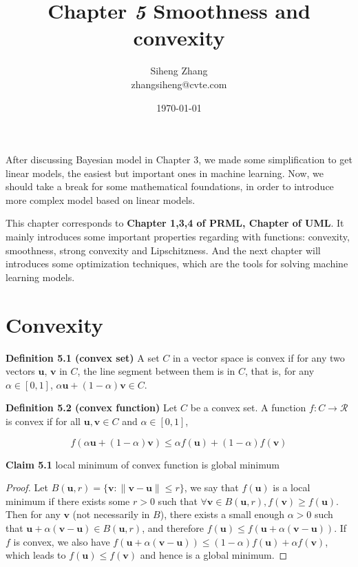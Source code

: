 \documentclass{article}
\author{Siheng Zhang\\zhangsiheng@cvte.com}
\title{Chapter \textbf{\textit{5}} Smoothness and convexity}
\date{\today}
\newtheorem*{proof}{Proof}
\begin{document}
\maketitle  

After discussing Bayesian model in Chapter 3, we made some simplification to get linear models, the easiest but important ones in machine learning. Now, we should take a break for some mathematical foundations, in order to introduce more complex model based on linear models.

This chapter corresponds to \textbf{Chapter 1,3,4 of PRML, Chapter of UML}. It mainly introduces some important properties regarding with functions: convexity, smoothness, strong convexity and Lipschitzness. And the next chapter will introduces some optimization techniques, which are the tools for solving machine learning models.

\tableofcontents
\newpage

\section{Convexity}

	\textbf{Definition 5.1 (convex set)} A set $C$ in a vector space is convex if for any two vectors $\mathbf{u}$, $\mathbf{v}$ in $C$, the line segment between them is in $C$, that is, for any $\alpha\in[0,1]$, $\alpha \mathbf{u} + (1-\alpha) \mathbf{v} \in C$.
	
	\textbf{Definition 5.2 (convex function)} Let $C$ be a convex set. A function $f: C\rightarrow \mathcal{R}$ is convex if for all $\mathbf{u}, \mathbf{v}\in C$ and $\alpha\in[0,1]$, 
	
	$$f(\alpha \mathbf{u} + (1-\alpha) \mathbf{v}) \leq \alpha f(\mathbf{u}) + (1-\alpha) f(\mathbf{v})$$
	
	\textbf{Claim 5.1} local minimum of convex function is global minimum
	\begin{proof}
	Let $B(\mathbf{u}, r)=\{\mathbf{v}: \|\mathbf{v}-\mathbf{u}\|\leq r\}$, we say that $f(\mathbf{u})$ is a local minimum if there exists some $r>0$ such that $\forall \mathbf{v} \in B(\mathbf{u}, r), f(\mathbf{v})\geq f(\mathbf{u})$. Then for any $\mathbf{v}$ (not necessarily in $B$), there exists a small enough $\alpha > 0$ such that $\mathbf{u}+\alpha(\mathbf{v}-\mathbf{u})\in B(\mathbf{u}, r)$, and therefore $f(\mathbf{u}) \leq f(\mathbf{u} + \alpha(\mathbf{v}-\mathbf{u}))$. If $f$ is convex, we also have $f(\mathbf{u} + \alpha(\mathbf{v}-\mathbf{u}))\leq (1-\alpha) f(\mathbf{u}) + \alpha f(\mathbf{v})$, which leads to $f(\mathbf{u})\leq f(\mathbf{v})$ and hence is a global minimum.
	\end{proof}
	
\end{document}
